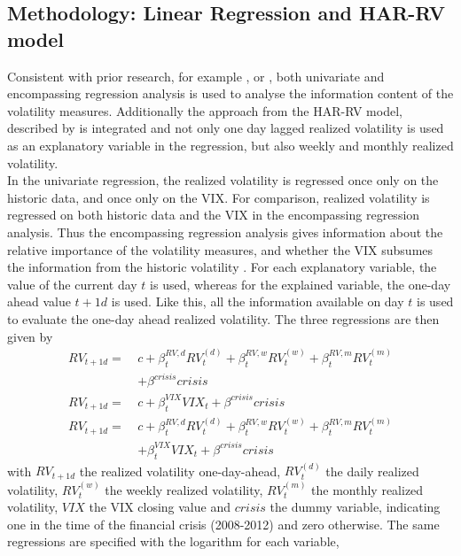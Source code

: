 \subsection{Methodology: Linear Regression and HAR-RV model}\label{sec:42Method}
Consistent with prior research, for example \textcite{jiang2003}, \textcite{canina1993} or \textcite{christensen1998}, both univariate and encompassing regression analysis is used to analyse the information content of the volatility measures. Additionally the approach from the HAR-RV model, described by \textcite{corsi2009} is integrated and not only one day lagged realized volatility is used as an explanatory variable in the regression, but also weekly and monthly realized volatility.\\
In the univariate regression, the realized volatility is regressed once only on the historic data, and once only on the \ac{VIX}. For comparison, realized volatility is regressed on both historic data and the \ac{VIX} in the encompassing regression analysis. Thus the encompassing regression analysis gives information about the relative importance of the volatility measures, and whether the \ac{VIX} subsumes the information from the historic volatility \parencite{jiang2003}. For each explanatory variable, the value of the current day $t$ is used, whereas for the explained variable, the one-day ahead value $t+1d$ is used. Like this, all the information available on day $t$ is used to evaluate the one-day ahead realized volatility. The three regressions are then given by
\begin{align}
RV_{t+1d} = \ &c + \beta^{RV,d}_{t} RV^{(d)}_{t} + \beta^{RV,w}_{t} RV^{(w)}_{t} + \beta^{RV,m}_{t} RV^{(m)}_{t} \nonumber \\
&+ \beta^{crisis} crisis \tag{Reg1a}  \label{eq:Reg1a}\\[1em]
RV_{t+1d} = \ &c + \beta^{VIX}_{t} VIX_{t} + \beta^{crisis} crisis  \tag{Reg2a}  \label{eq:Reg2a}\\[1em]
RV_{t+1d} = \ &c + \beta^{RV,d}_{t} RV^{(d)}_{t} + \beta^{RV,w}_{t} RV^{(w)}_{t} + \beta^{RV,m}_{t} RV^{(m)}_{t} \nonumber \\
&+ \beta^{VIX}_{t} VIX_{t} + \beta^{crisis} crisis  \tag{Reg3a}  \label{eq:Reg3a}
\end{align}
with $RV_{t+1d}$ the realized volatility one-day-ahead, $RV^{(d)}_{t}$ the daily realized volatility, $RV^{(w)}_{t}$ the weekly realized volatility, $RV^{(m)}_{t}$ the monthly realized volatility, $VIX$ the \ac{VIX} closing value and $crisis$ the dummy variable, indicating one in the time of the financial crisis (2008-2012) and zero otherwise. The same regressions are specified with the logarithm for each variable,
